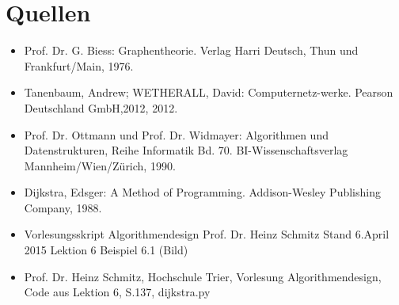 \section{Quellen}

\begin{frame}
	\begin{itemize}
		\item Prof. Dr. G. Biess: Graphentheorie. Verlag Harri Deutsch, Thun und Frankfurt/Main, 1976.
		\item Tanenbaum, Andrew; WETHERALL, David: Computernetz-werke. Pearson Deutschland GmbH,2012, 2012.
		\item Prof. Dr. Ottmann und Prof. Dr. Widmayer: Algorithmen und Datenstrukturen, Reihe Informatik Bd. 70. BI-Wissenschaftsverlag Mannheim/Wien/Zürich, 1990.
		\item Dijkstra, Edsger: A Method of Programming. Addison-Wesley Publishing Company, 1988.
		\item Vorlesungsskript Algorithmendesign Prof. Dr. Heinz Schmitz Stand 6.April 2015 Lektion 6 Beispiel 6.1 (Bild)
		\item Prof. Dr. Heinz Schmitz, Hochschule Trier, Vorlesung Algorithmendesign, Code aus Lektion 6, S.137, dijkstra.py
	\end{itemize}
\end{frame}